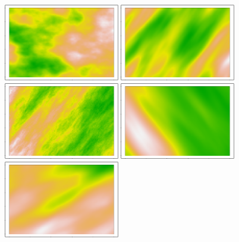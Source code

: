 \documentclass[article,nojss]{jss}\usepackage[]{graphicx}\usepackage[]{color}
\newenvironment{knitrout}{}{} %
\begin{document}
\begin{figure}[H]
\begin{knitrout}
\includegraphics[width=0.45\textwidth]{figure/maternplot-6} 
\includegraphics[width=0.45\textwidth]{figure/maternplot-7} 
\includegraphics[width=0.45\textwidth]{figure/maternplot-8} 
\includegraphics[width=0.45\textwidth]{figure/maternplot-9} 
\includegraphics[width=0.45\textwidth]{figure/maternplot-10} 
\end{knitrout}
\caption{\label{fig5} }
\end{figure}
\end{document}
